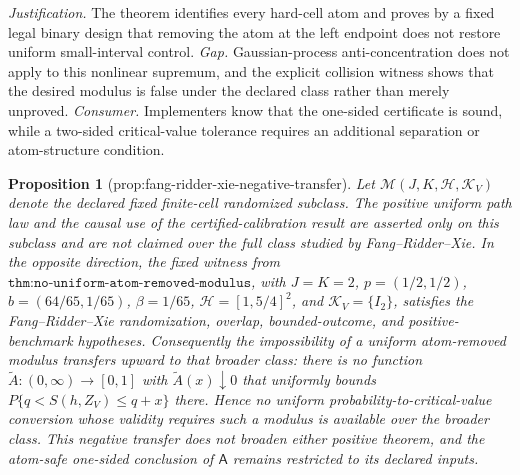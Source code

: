 \documentclass{article}
\newtheorem{proposition}{Proposition}
\begin{document}
\par\smallskip\noindent \textit{Justification.} The theorem identifies every hard-cell atom and proves by a fixed legal binary design that removing the atom at the left endpoint does not restore uniform small-interval control. \textit{Gap.} Gaussian-process anti-concentration does not apply to this nonlinear supremum, and the explicit collision witness shows that the desired modulus is false under the declared class rather than merely unproved. \textit{Consumer.} Implementers know that the one-sided certificate is sound, while a two-sided critical-value tolerance requires an additional separation or atom-structure condition.

\begin{proposition}[prop:fang-ridder-xie-negative-transfer]\label{prop:fang-ridder-xie-negative-transfer}
Let \(\mathcal M(J,K,\mathcal H,\mathcal K_V)\) denote the declared fixed finite-cell randomized subclass.  The positive uniform path law and the causal use of the certified-calibration result are asserted only on this subclass and are not claimed over the full class studied by Fang--Ridder--Xie.  In the opposite direction, the fixed witness from \(\texttt{thm:no-uniform-atom-removed-modulus}\), with \(J=K=2\), \(p=(1/2,1/2)\), \(b=(64/65,1/65)\), \(\beta=1/65\), \(\mathcal H=[1,5/4]^2\), and \(\mathcal K_V=\{I_2\}\), satisfies the Fang--Ridder--Xie randomization, overlap, bounded-outcome, and positive-benchmark hypotheses.  Consequently the impossibility of a uniform atom-removed modulus transfers upward to that broader class: there is no function \(\widetilde A:(0,\infty)\to[0,1]\) with \(\widetilde A(x)\downarrow0\) that uniformly bounds \(P\{q<S(h,Z_V)\le q+x\}\) there.  Hence no uniform probability-to-critical-value conversion whose validity requires such a modulus is available over the broader class.  This negative transfer does not broaden either positive theorem, and the atom-safe one-sided conclusion of \(\mathsf A\) remains restricted to its declared inputs.
\end{proposition}
\end{document}
